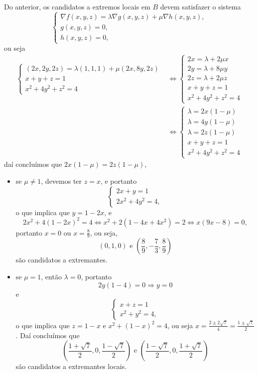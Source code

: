 \begin{example}
    Do anterior, os candidatos a extremos locais em \(B\) devem satisfazer o sistema \[\begin{cases}
    \nabla f(x,y,z) = \lambda \nabla g(x,y,z) + \mu \nabla h(x,y,z), \\
    g(x,y,z) = 0, \\
    h(x,y,z) = 0,
\end{cases}\] ou seja
    \begin{align*}
        \begin{cases}
            (2x,2y,2z) = \lambda(1,1,1) + \mu (2x,8y,2z) \\
            x + y + z =1 \\
            x^2 + 4y^2 + z^2 = 4
        \end{cases} 
        & \Leftrightarrow \begin{cases}
        2x = \lambda + 2\mu x \\
        2y = \lambda + 8\mu y \\
        2z = \lambda + 2\mu z \\
        x + y + z =1 \\
        x^2 + 4y^2 + z^2 = 4
        \end{cases} \\
            & \Leftrightarrow \begin{cases}
            \lambda = 2x(1-\mu) \\
            \lambda = 4y(1-\mu) \\
            \lambda = 2z(1-\mu) \\
            x + y + z =1 \\
            x^2 + 4y^2 + z^2 = 4
        \end{cases}
    \end{align*}
daí concluímos que \(2x(1-\mu) = 2z(1-\mu)\),
    \begin{itemize}
        \item se \(\mu \neq 1\), devemos ter \(z = x\), e portanto \[\begin{cases}
            2x + y = 1 \\
            2x^2 + 4y^2 = 4,
        \end{cases}\] o que implica que \(y = 1-2x\), e \[2x^2 + 4(1-2x)^2 = 4 \Leftrightarrow x^2 + 2(1-4x+4x^2) = 2 \Leftrightarrow x(9x-8) = 0,\] portanto \(x=0\) ou \(x=\frac{8}{9}\), ou seja, \[(0,1,0) \text{ e } \left( \frac{8}{9},-\frac{7}{3}, \frac{8}{9} \right)\] são candidatos a extremantes.
        \item  se \(\mu = 1\), então \(\lambda = 0\), portanto \[2y(1-4) = 0 \Rightarrow y =0\] e \[\begin{cases}
            x + z = 1 \\
            x^2 + y^2 = 4,
        \end{cases}\] o que implica que \(z = 1-x\) e \(x^2 + (1-x)^2 = 4\), ou seja \(x = \frac{2\pm2\sqrt{7}}{4} = \frac{1\pm\sqrt{7}}{2}\). Daí concluímos que \[\left( \frac{1+\sqrt{7}}{2},0,\frac{1-\sqrt{7}}{2} \right) \text{ e } \left( \frac{1-\sqrt{7}}{2},0,\frac{1+\sqrt{7}}{2} \right)\] são candidatos a extremantes locais.
    \end{itemize}


\end{example}
